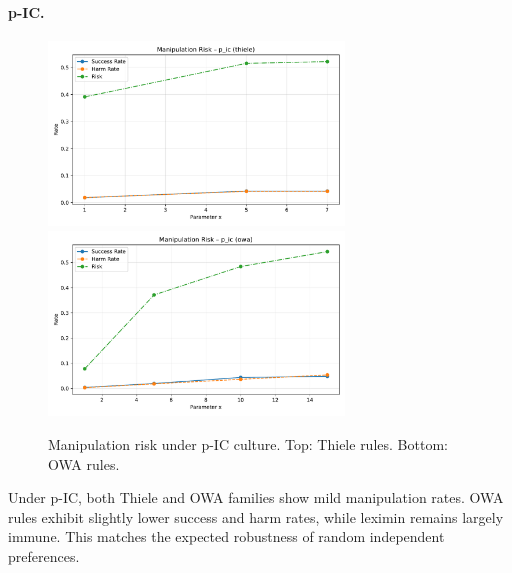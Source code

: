 \documentclass[11pt]{article}
\begin{document}
\paragraph{p-IC.}
\begin{figure}[h!]
\centering
\includegraphics[width=0.7\textwidth]{figures/risk_p_ic_thiele.pdf}
\includegraphics[width=0.7\textwidth]{figures/risk_p_ic_owa.pdf}
\caption{Manipulation risk under p-IC culture. Top: Thiele rules. Bottom: OWA rules.}
\end{figure}
Under p-IC, both Thiele and OWA families show mild manipulation rates.
OWA rules exhibit slightly lower success and harm rates, while leximin remains
largely immune. This matches the expected robustness of random independent
preferences.
\end{document}
